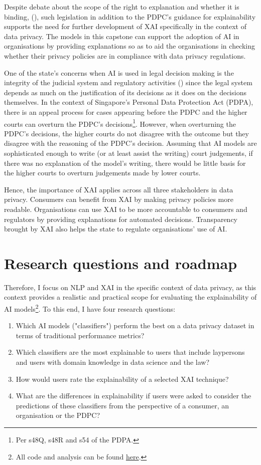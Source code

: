 Despite debate about the scope of the right to explanation and whether it is binding, (\cite{chesterman2021_transparency}), such legislation in addition to the PDPC's guidance for explainability supports the need for further development of XAI specifically in the context of data privacy. The models in this capstone can support the adoption of AI in organisations by providing explanations so as to aid the organisations in checking whether their privacy policies are in compliance with data privacy regulations.

One of the state's concerns when AI is used in legal decision making is the integrity of the judicial system and regulatory activities (\cite{chesterman2021_opacity}) since the legal system depends as much on the justification of its decisions as it does on the decisions themselves. In the context of Singapore's Personal Data Protection Act (PDPA), there is an appeal process for cases appearing before the PDPC and the higher courts can overturn the PDPC's decisions\footnote{Per s48Q, s48R and s54 of the PDPA.}. However, when overturning the PDPC's decisions, the higher courts do not disagree with the outcome but they disagree with the reasoning of the PDPC's decision. Assuming that AI models are sophisticated enough to write (or at least assist the writing) court judgements, if there was no explanation of the model's writing, there would be little basis for the higher courts to overturn judgements made by lower courts. 

Hence, the importance of XAI applies across all three stakeholders in data privacy. Consumers can benefit from XAI by making privacy policies more readable. Organisations can use XAI to be more accountable to consumers and regulators by providing explanations for automated decisions. Transparency brought by XAI also helps the state to regulate organisations' use of AI.

\section{Research questions and roadmap}
Therefore, I focus on NLP and XAI in the specific context of data privacy, as this context provides a realistic and practical scope for evaluating the explainability of AI models\footnote{All code and analysis can be found \href{https://github.com/TristanKoh/capstone-repo/}{here}.}. To this end, I have four research questions: 

\begin{enumerate}
  \item Which AI models ("classifiers") perform the best on a data privacy dataset in terms of traditional performance metrics?
  \item Which classifiers are the most explainable to users that include laypersons and users with domain knowledge in data science and the law?
  \item How would users rate the explainability of a selected XAI technique?
  \item What are the differences in explainability if users were asked to consider the predictions of these classifiers from the perspective of a consumer, an organisation or the PDPC?
\end{enumerate}

